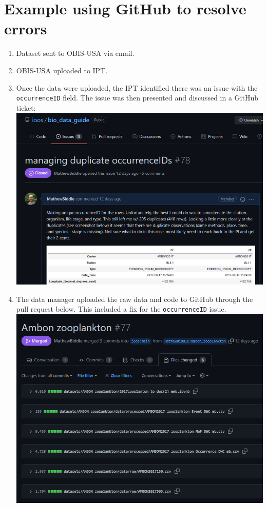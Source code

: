 \documentclass[
]{book}
\providecommand{\tightlist}{%
  \setlength{\itemsep}{0pt}\setlength{\parskip}{0pt}}
\begin{document}
\hypertarget{example-using-github-to-resolve-errors}{%
\section{Example using GitHub to resolve errors}\label{example-using-github-to-resolve-errors}}

\begin{enumerate}
\def\labelenumi{\arabic{enumi}.}
\tightlist
\item
  Dataset sent to OBIS-USA via email.
\item
  OBIS-USA uploaded to IPT.
\item
  Once the data were uploaded, the IPT identified there was an issue with the \texttt{occurrenceID} field. The issue was then
  presented and discussed in a GitHub ticket:
  \href{https://github.com/ioos/bio_data_guide/issues/78}{\includegraphics{./figs/issue_78.png}}
\item
  The data manager uploaded the raw data and code to GitHub through the pull request below. This included a fix for
  the \texttt{occurrenceID} issue.
  \href{https://github.com/ioos/bio_data_guide/pull/77}{\includegraphics{./figs/PR_77.png}}

\end{enumerate}
\end{document}
